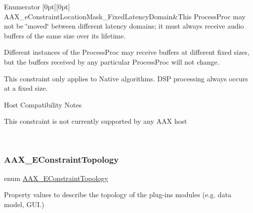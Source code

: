 \begin{DoxyEnumFields}{Enumerator}
[0pt][0pt]{}\mbox{\label{a00491_a0c5d795c1fd021c5b9b541febc34601aa12ffeaf435dc753cbd90adb409b739cd}} 
A\+A\+X\+\_\+e\+Constraint\+Location\+Mask\+\_\+\+Fixed\+Latency\+Domain&This {\ttfamily Process\+Proc} may not be \char`\"{}moved\char`\"{} between different latency domains; it must always receive audio buffers of the same size over its lifetime. \begin{DoxyItemize}
\item Different instances of the {\ttfamily Process\+Proc} may receive buffers at different fixed sizes, but the buffers received by any particular {\ttfamily Process\+Proc} will not change. \item This constraint only applies to Native algorithms. D\+SP processing always occurs at a fixed size.\end{DoxyItemize}
\begin{DoxyRefDesc}{Host Compatibility Notes}
\item[\mbox{\hyperlink{a00786__compatibility_notes000047}{Host Compatibility Notes}}]This constraint is not currently supported by any A\+AX host \end{DoxyRefDesc}
\\
\hline

\end{DoxyEnumFields}
\mbox{\label{a00491_a714f56a9b0ab98a3a5365760adf77624}} 
\subsubsection{\texorpdfstring{AAX\_EConstraintTopology}{AAX\_EConstraintTopology}}
{\footnotesize\ttfamily enum \mbox{\hyperlink{a00491_a714f56a9b0ab98a3a5365760adf77624}{A\+A\+X\+\_\+\+E\+Constraint\+Topology}}}



Property values to describe the topology of the plug-\/in\textquotesingle{}s modules (e.\+g. data model, G\+UI.) 


